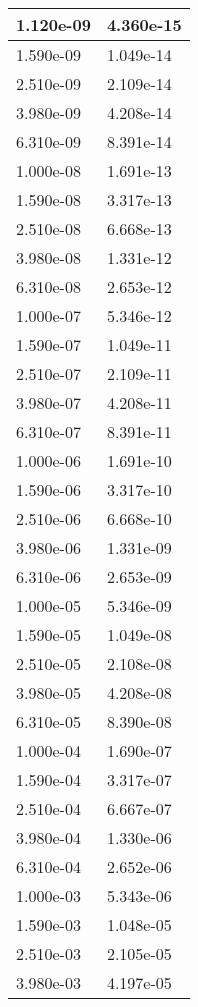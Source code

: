 \documentclass[review]{elsarticle}
\begin{document}
\begin{table}[h]
	\caption{ }
	\label{tab:my-table}
	\begin{tabular}{|l|l|}
		\hline 
		1.120e-09&4.360e-15\\ \hline 
		1.590e-09&1.049e-14\\ \hline 
		2.510e-09&2.109e-14\\ \hline 
		3.980e-09&4.208e-14\\ \hline 
		6.310e-09&8.391e-14\\ \hline 
		1.000e-08&1.691e-13\\ \hline 
		1.590e-08&3.317e-13\\ \hline 
		2.510e-08&6.668e-13\\ \hline 
		3.980e-08&1.331e-12\\ \hline 
		6.310e-08&2.653e-12\\ \hline 
		1.000e-07&5.346e-12\\ \hline 
		1.590e-07&1.049e-11\\ \hline 
		2.510e-07&2.109e-11\\ \hline 
		3.980e-07&4.208e-11\\ \hline 
		6.310e-07&8.391e-11\\ \hline 
		1.000e-06&1.691e-10\\ \hline 
		1.590e-06&3.317e-10\\ \hline 
		2.510e-06&6.668e-10\\ \hline 
		3.980e-06&1.331e-09\\ \hline 
		6.310e-06&2.653e-09\\ \hline 
		1.000e-05&5.346e-09\\ \hline 
		1.590e-05&1.049e-08\\ \hline 
		2.510e-05&2.108e-08\\ \hline 
		3.980e-05&4.208e-08\\ \hline 
		6.310e-05&8.390e-08\\ \hline 
		1.000e-04&1.690e-07\\ \hline 
		1.590e-04&3.317e-07\\ \hline 
		2.510e-04&6.667e-07\\ \hline 
		3.980e-04&1.330e-06\\ \hline 
		6.310e-04&2.652e-06\\ \hline 
		1.000e-03&5.343e-06\\ \hline 
		1.590e-03&1.048e-05\\ \hline 
		2.510e-03&2.105e-05\\ \hline 
		3.980e-03&4.197e-05\\ \hline 

\end{tabular}
\end{table}
\end{document}
